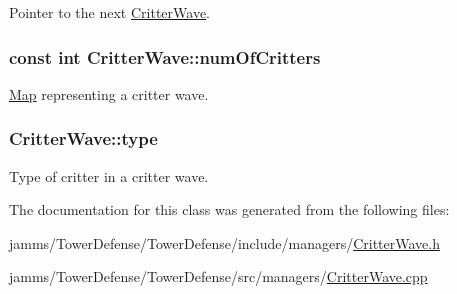 Pointer to the next \hyperlink{class_critter_wave}{Critter\+Wave}. 

\hypertarget{class_critter_wave_a6c8edb08492ed068c5e4c5323695c29d}{
\subsubsection[{num\+Of\+Critters}]{\setlength{\rightskip}{0pt plus 5cm}const int Critter\+Wave\+::num\+Of\+Critters}}\label{class_critter_wave_a6c8edb08492ed068c5e4c5323695c29d}


\hyperlink{class_map}{Map} representing a critter wave. 

\hypertarget{class_critter_wave_aaf7c97d4f340ffa811ca452745ef6b24}{
\subsubsection[{type}]{ Critter\+Wave\+::type}}\label{class_critter_wave_aaf7c97d4f340ffa811ca452745ef6b24}


Type of critter in a critter wave. 



The documentation for this class was generated from the following files\+:\begin{DoxyCompactItemize}
\item 
jamms/\+Tower\+Defense/\+Tower\+Defense/include/managers/\hyperlink{_critter_wave_8h}{Critter\+Wave.\+h}\item 
jamms/\+Tower\+Defense/\+Tower\+Defense/src/managers/\hyperlink{_critter_wave_8cpp}{Critter\+Wave.\+cpp}\end{DoxyCompactItemize}
